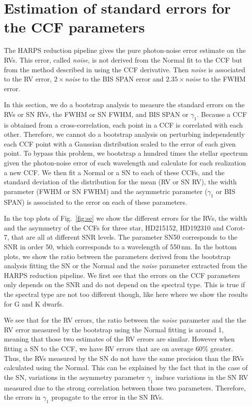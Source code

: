 \documentclass[11pt, oneside]{article}
\begin{document}
\section{Estimation of standard errors for the CCF parameters} \label{sec:5}

The HARPS reduction pipeline gives the pure photon-noise error estimate on the RVs. This error, called \emph{noise}, is not derived from the Normal fit to the CCF but from the method described in \citet{Bouchy-2001b} using the CCF derivative. Then \emph{noise} is associated to the RV error, $2\times$\emph{noise} to the BIS SPAN error and $2.35\times$\emph{noise} to the FWHM error.

In this section, we do a bootstrap analysis to measure the standard errors on the RVs or SN RVs, the FWHM or SN FWHM, and BIS SPAN or $\gamma_1$. Because a CCF is obtained from a cross-correlation, each point in a CCF is correlated with each other. Therefore, we cannot do a bootstrap analysis on perturbing independently each CCF point with a Gaussian distribution scaled to the error of each given point. To bypass this problem, we bootstrap a hundred times the stellar spectrum given the photon-noise error of each wavelength and calculate for each realization a new CCF. We then fit a Normal or a SN to each of these CCFs, and the standard deviation of the distribution for the mean (RV or SN RV), the width parameter (FWHM or SN FWHM) and the asymmetric parameter ($\gamma_1$ or BIS SPAN) is associated to the error on each of these parameters.

In the top plots of Fig.~\ref{fig:se} we show the different errors for the RVs, the width and the asymmetry of the CCFs for three star, HD215152, HD192310 and Corot-7, that are all at different SNR levels. The parameter SN50 corresponds to the SNR in order 50, which corresponds to a wavelength of 550\,nm. In the bottom plots, we show the ratio between the parameters derived from the bootstrap analysis fitting the SN or the Normal and the \emph{noise} parameter extracted from the HARPS reduction pipeline. We first see that the errors on the CCF parameters only depends on the SNR and do not depend on the spectral type. This is true if the spectral type are not too different though, like here where we show the results for G and K dwarfs.

We see that for the RV errors, the ratio between the \emph{noise} parameter and the the RV error measured by the bootstrap using the Normal fitting is around 1, meaning that those two estimates of the RV errors are similar. However when fitting a SN to the CCF, we have RV errors that are on average 60\% greater. Thus, the RVs measured by the SN do not have the same precision than the RVs calculated using the Normal. This can be explained by the fact that in the case of the SN, variations in the asymmetry parameter $\gamma_1$ induce variations in the SN RV measured due to the strong correlation between those two parameters. Therefore, the errors in $\gamma_1$ propagate to the error in the SN RVs.
\end{document}
